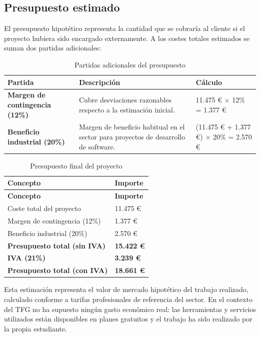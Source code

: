 \subsection{Presupuesto estimado}

El presupuesto hipotético representa la cantidad que se cobraría al cliente si el proyecto hubiera sido encargado externamente. A los costes totales estimados se suman dos partidas adicionales:

\begin{table}[H]
\centering
\caption{Partidas adicionales del presupuesto}
\label{tab:partidas_adicionales_presupuesto}
\begin{tabular}{p{5cm}p{5.5cm}p{3cm}}
\toprule
\textbf{Partida} & \textbf{Descripción} & \textbf{Cálculo} \\
\midrule
\textbf{Margen de contingencia (12\%)} & Cubre desviaciones razonables respecto a la estimación inicial. & 11.475 € $\times$ 12\% = 1.377 € \\
\textbf{Beneficio industrial (20\%)} & Margen de beneficio habitual en el sector para proyectos de desarrollo de software. & (11.475 € + 1.377 €) $\times$ 20\% = 2.570 € \\
\bottomrule
\end{tabular}
\end{table}

\begin{longtable}{p{8cm}p{4cm}}
\caption{Presupuesto final del proyecto}\label{tab:presupuesto_final}\\
\toprule
\textbf{Concepto} & \textbf{Importe} \\
\midrule
\endfirsthead
\toprule
\textbf{Concepto} & \textbf{Importe} \\
\midrule
\endhead
\bottomrule
\endlastfoot
Coste total del proyecto & 11.475 € \\
Margen de contingencia (12\%) & 1.377 € \\
Beneficio industrial (20\%) & 2.570 € \\
\midrule
\textbf{Presupuesto total (sin IVA)} & \textbf{15.422 €} \\
\textbf{IVA (21\%)} & \textbf{3.239 €} \\
\midrule
\textbf{Presupuesto total (con IVA)} & \textbf{18.661 €} \\
\end{longtable}

Esta estimación representa el valor de mercado hipotético del trabajo realizado, calculado conforme a tarifas profesionales de referencia del sector. En el contexto del TFG no ha supuesto ningún gasto económico real: las herramientas y servicios utilizados están disponibles en planes gratuitos y el trabajo ha sido realizado por la propia estudiante.


